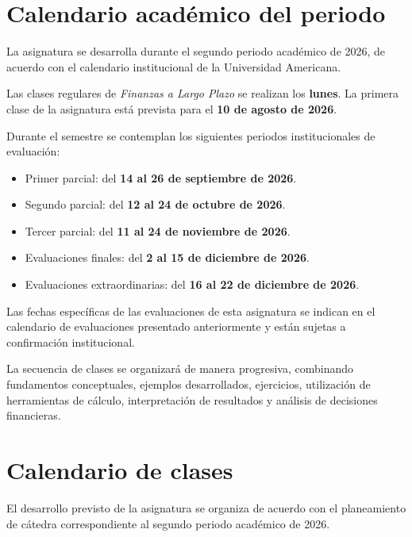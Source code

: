 \documentclass[10pt]{article}
\begin{document}
\section{Calendario académico del periodo}

La asignatura se desarrolla durante el segundo periodo académico de 2026,
de acuerdo con el calendario institucional de la Universidad Americana.\parencite{ua2026calendarioAcademico}

Las clases regulares de \textit{Finanzas a Largo Plazo} se realizan los
\textbf{lunes}. La primera clase de la asignatura está prevista para el
\textbf{10 de agosto de 2026}.\parencite{armoa2026planeamiento}

Durante el semestre se contemplan los siguientes periodos institucionales
de evaluación:

\begin{itemize}
    \item Primer parcial: del \textbf{14 al 26 de septiembre de 2026}.
    \item Segundo parcial: del \textbf{12 al 24 de octubre de 2026}.
    \item Tercer parcial: del \textbf{11 al 24 de noviembre de 2026}.
    \item Evaluaciones finales: del \textbf{2 al 15 de diciembre de 2026}.
    \item Evaluaciones extraordinarias: del \textbf{16 al 22 de diciembre de 2026}.
\end{itemize}\parencite{ua2026calendarioAcademico}

Las fechas específicas de las evaluaciones de esta asignatura se indican
en el calendario de evaluaciones presentado anteriormente y están sujetas
a confirmación institucional.

La secuencia de clases se organizará de manera progresiva, combinando
fundamentos conceptuales, ejemplos desarrollados, ejercicios, utilización
de herramientas de cálculo, interpretación de resultados y análisis de
decisiones financieras.







\section{Calendario de clases}

El desarrollo previsto de la asignatura se organiza de acuerdo con el
planeamiento de cátedra correspondiente al segundo periodo académico
de 2026.\parencite{armoa2026planeamiento}
\end{document}
